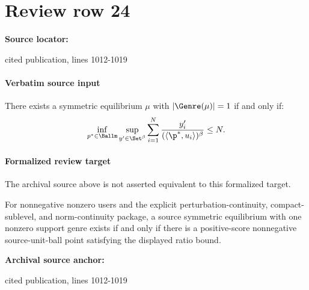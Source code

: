\documentclass[10pt]{article}
\begin{document}
\section*{Review row 24}
\textbf{Source locator:} {\footnotesize\raggedright cited publication, lines 1012-\allowbreak{}1019\par}
\paragraph{Verbatim source input}
\begin{ReviewVerbatim}
\begin{lemma}
\label{lemma:conditiongen}
There exists a symmetric equilibrium $\mu$ with $|\Genre(\mu)| = 1$ if and only if:
\begin{equation}
\label{eq:conditioninter}
\inf_{p^* \in \Ballm} \sup_{y' \in \Set^{\beta}} \sum_{i=1}^N  \frac{y'_i}{(\langle \p^*, u_i \rangle)^{\beta}} \le N.
\end{equation}
\end{lemma}
\end{ReviewVerbatim}


\paragraph{Formalized review target}
The archival source above is not asserted equivalent to this formalized target.
\begin{ReviewVerbatim}
For nonnegative nonzero users and the explicit perturbation-continuity, compact-sublevel, and norm-continuity package, a source symmetric equilibrium with one nonzero support genre exists if and only if there is a positive-score nonnegative source-unit-ball point satisfying the displayed ratio bound.
\end{ReviewVerbatim}

\textbf{Archival source anchor:} {\footnotesize\raggedright cited publication, lines 1012-\allowbreak{}1019\par}
\end{document}
